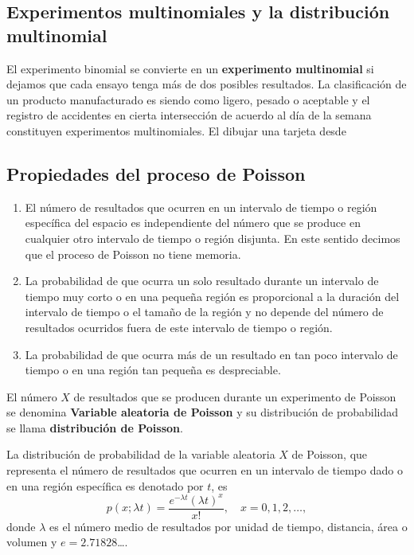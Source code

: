 \subsection*{Experimentos multinomiales y la distribución multinomial}

El experimento binomial se convierte en un \textbf{experimento multinomial} si dejamos que cada ensayo tenga más de dos posibles resultados. La clasificación de un producto manufacturado es siendo como ligero, pesado o aceptable y el registro de accidentes en cierta intersección de acuerdo al día de la semana constituyen experimentos multinomiales. El dibujar una tarjeta desde

\subsection*{Propiedades del proceso de Poisson}

\begin{enumerate}
	\item El número de resultados que ocurren en un intervalo de tiempo o región específica del espacio es independiente del número que se produce en cualquier otro intervalo de tiempo o región disjunta. En este sentido decimos que el proceso de Poisson no tiene memoria.
	\item La probabilidad de que ocurra un solo resultado durante un intervalo de tiempo muy corto o en una pequeña región es proporcional a la duración del intervalo de tiempo o el tamaño de la región y no depende del número de resultados ocurridos fuera de este intervalo de tiempo o región.
	\item La probabilidad de que ocurra más de un resultado en tan poco intervalo de tiempo o en una región tan pequeña es despreciable.
\end{enumerate}

El número $X$ de resultados que se producen durante un experimento de Poisson se denomina \textbf{Variable aleatoria de Poisson} y su distribución de probabilidad se llama \textbf{distribución de Poisson}.

\begin{definition}[]
La distribución de probabilidad de la variable aleatoria $X$ de Poisson, que representa el número de resultados que ocurren en un intervalo de tiempo dado o en una región específica es denotado por $t$, es
\begin{equation*}
p\left(x;\lambda t\right)=\frac{e^{-\lambda t}{\left(\lambda t\right)}^{x}}{x!},\quad x=0,1,2,\ldots,
\end{equation*}
donde $\lambda$ es el número medio de resultados por unidad de tiempo, distancia, área o volumen y $e=2.71828$\ldots.
\end{definition}


